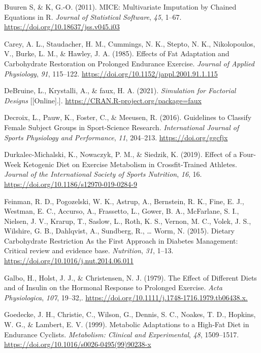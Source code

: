 \documentclass[]{cik}%
\newlength{\cslhangindent}
\newlength{\cslentryspacingunit} %
\newenvironment{CSLReferences}[2] %
 {%
  \setlength{\parindent}{0pt}
  \ifodd #1
  \let\oldpar\par
  \def\par{\hangindent=\cslhangindent\oldpar}
  \fi
  \setlength{\parskip}{#2\cslentryspacingunit}
 }%
 {}
\begin{document}
\begin{CSLReferences}{1}{0}
\leavevmode{}%
Buuren S, \& K, G.-O. (2011). MICE: Multivariate Imputation by Chained
Equations in R. \emph{Journal of Statistical Software}, \emph{45},
1--67. \url{https://doi.org/10.18637/jss.v045.i03}

\leavevmode{}%
Carey, A. L., Staudacher, H. M., Cummings, N. K., Stepto, N. K.,
Nikolopoulos, V., Burke, L. M., \& Hawley, J. A. (1985). Effects of Fat
Adaptation and Carbohydrate Restoration on Prolonged Endurance Exercise.
\emph{Journal of Applied Physiology}, \emph{91}, 115--122.
\url{https://doi.org/10.1152/jappl.2001.91.1.115}

\leavevmode{}%
DeBruine, L., Krystalli, A., \& faux, H. A. (2021). \emph{Simulation for
Factorial Designs} {[}{[}Online{]}.{]}.
\url{https://CRAN.R-project.org/package=faux}

\leavevmode{}%
Decroix, L., Pauw, K., Foster, C., \& Meeusen, R. (2016). Guidelines to
Classify Female Subject Groups in Sport-Science Research.
\emph{International Journal of Sports Physiology and Performance},
\emph{11}, 204--213. \url{https://doi.org/ggcfjx}

\leavevmode{}%
Durkalec-Michalski, K., Nowaczyk, P. M., \& Siedzik, K. (2019). Effect
of a Four-Week Ketogenic Diet on Exercise Metabolism in Crossfit-Trained
Athletes. \emph{Journal of the International Society of Sports
Nutrition}, \emph{16}, 16.
\url{https://doi.org/10.1186/s12970-019-0284-9}

\leavevmode{}%
Feinman, R. D., Pogozelski, W. K., Astrup, A., Bernstein, R. K., Fine,
E. J., Westman, E. C., Accurso, A., Frassetto, L., Gower, B. A.,
McFarlane, S. I., Nielsen, J. V., Krarup, T., Saslow, L., Roth, K. S.,
Vernon, M. C., Volek, J. S., Wilshire, G. B., Dahlqvist, A., Sundberg,
R., \ldots{} Worm, N. (2015). Dietary Carbohydrate Restriction As the
First Approach in Diabetes Management: Critical review and evidence
base. \emph{Nutrition}, \emph{31}, 1--13.
\url{https://doi.org/10.1016/j.nut.2014.06.011}

\leavevmode{}%
Galbo, H., Holst, J. J., \& Christensen, N. J. (1979). The Effect of
Different Diets and of Insulin on the Hormonal Response to Prolonged
Exercise. \emph{Acta Physiologica}, \emph{107}, 19--32,.
\url{https://doi.org/10.1111/j.1748-1716.1979.tb06438.x.}

\leavevmode{}%
Goedecke, J. H., Christie, C., Wilson, G., Dennis, S. C., Noakes, T. D.,
Hopkins, W. G., \& Lambert, E. V. (1999). Metabolic Adaptations to a
High-Fat Diet in Endurance Cyclists. \emph{Metabolism: Clinical and
Experimental}, \emph{48}, 1509--1517.
\url{https://doi.org/10.1016/s0026-0495(99)90238-x}


\end{CSLReferences}
\end{document}
